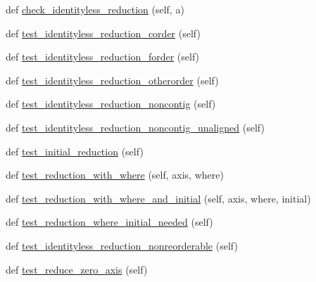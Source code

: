 \begin{DoxyCompactItemize}
\item 
def \hyperlink{classnumpy_1_1core_1_1tests_1_1test__ufunc_1_1TestUfunc_ab9317d958e5305e75ad3935e34b53d3f}{check\+\_\+identityless\+\_\+reduction} (self, a)
\item 
def \hyperlink{classnumpy_1_1core_1_1tests_1_1test__ufunc_1_1TestUfunc_a49fad07704818f08160229a3dfa25904}{test\+\_\+identityless\+\_\+reduction\+\_\+corder} (self)
\item 
def \hyperlink{classnumpy_1_1core_1_1tests_1_1test__ufunc_1_1TestUfunc_ae89faa4e30c229eb764d56d214f94649}{test\+\_\+identityless\+\_\+reduction\+\_\+forder} (self)
\item 
def \hyperlink{classnumpy_1_1core_1_1tests_1_1test__ufunc_1_1TestUfunc_a87ef0ac39d0f70d8f29ff5f3158fc01d}{test\+\_\+identityless\+\_\+reduction\+\_\+otherorder} (self)
\item 
def \hyperlink{classnumpy_1_1core_1_1tests_1_1test__ufunc_1_1TestUfunc_a8ac5fe6970b42d45ea0f109ce260f320}{test\+\_\+identityless\+\_\+reduction\+\_\+noncontig} (self)
\item 
def \hyperlink{classnumpy_1_1core_1_1tests_1_1test__ufunc_1_1TestUfunc_aa699f3969f91ec22552feac54b0d7828}{test\+\_\+identityless\+\_\+reduction\+\_\+noncontig\+\_\+unaligned} (self)
\item 
def \hyperlink{classnumpy_1_1core_1_1tests_1_1test__ufunc_1_1TestUfunc_a37440c91d000119a46d6de4993c766ce}{test\+\_\+initial\+\_\+reduction} (self)
\item 
def \hyperlink{classnumpy_1_1core_1_1tests_1_1test__ufunc_1_1TestUfunc_ae341d96631695e232eecff890ce8cb55}{test\+\_\+reduction\+\_\+with\+\_\+where} (self, axis, where)
\item 
def \hyperlink{classnumpy_1_1core_1_1tests_1_1test__ufunc_1_1TestUfunc_a367289d782f1cbe0b62b3439ea1dbf37}{test\+\_\+reduction\+\_\+with\+\_\+where\+\_\+and\+\_\+initial} (self, axis, where, initial)
\item 
def \hyperlink{classnumpy_1_1core_1_1tests_1_1test__ufunc_1_1TestUfunc_a273d231556710c9a070dc8eb29cf17f4}{test\+\_\+reduction\+\_\+where\+\_\+initial\+\_\+needed} (self)
\item 
def \hyperlink{classnumpy_1_1core_1_1tests_1_1test__ufunc_1_1TestUfunc_a651ceac88b42c8bdb8e060e7c13c6b2c}{test\+\_\+identityless\+\_\+reduction\+\_\+nonreorderable} (self)
\item 
def \hyperlink{classnumpy_1_1core_1_1tests_1_1test__ufunc_1_1TestUfunc_a627543eeaab557a5152280dee310f213}{test\+\_\+reduce\+\_\+zero\+\_\+axis} (self)
\item 

\end{DoxyCompactItemize}
